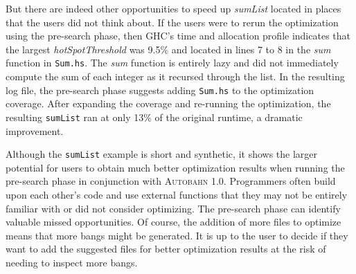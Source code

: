 \documentclass[format=sigplan, review=true]{acmart}
\newcommand{\hotspots}[0]{hot spots}
\newcommand{\hotspotcost}[0]{\textit{hotSpotThreshold}}
\newcommand{\Ao}[0]{\textsc{Autobahn 1.0}}
\newcommand{\preopt}[0]{pre-search}
\begin{document}
But there are indeed other opportunities to speed up \textit{sumList}
located in places that the users did not think about. If the users were
to rerun the optimization using the \preopt{} phase, then GHC's time and
allocation profile indicates that the largest \hotspotcost{} was 9.5\%
and located in lines 7 to 8 in the \textit{sum} function
in \texttt{Sum.hs}. The \textit{sum} function is entirely lazy and did
not immediately compute the sum of each integer as it recursed through
the list. In the resulting log file, the \preopt{} phase 
suggests 
adding \texttt{Sum.hs} to the optimization coverage.
After expanding the coverage and re-running the optimization,
the resulting \texttt{sumList} ran at only 13\% of the original
runtime, a dramatic improvement.

Although the \texttt{sumList} example is short and synthetic, it shows
the larger potential for users to obtain much better optimization
results when running the \preopt{} phase in conjunction
with \Ao{}. Programmers often build upon each other's code and use
external functions that they may not be entirely familiar with or did
not consider optimizing. The \preopt{} phase can identify valuable
missed opportunities. Of
course, the addition of more files to optimize means that more bangs
might be generated. It is up to the user to decide if they want to add
the suggested files for better optimization results at the risk of
needing to inspect more bangs.
\newline

\end{document}
